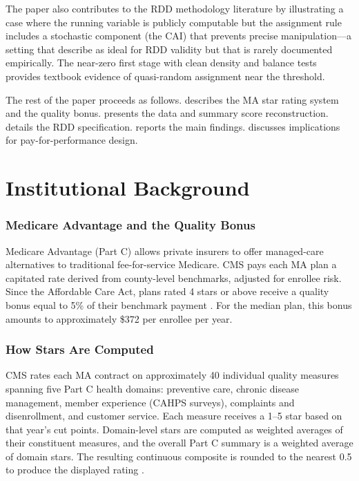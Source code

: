 \documentclass[12pt]{article}
\begin{document}
The paper also contributes to the RDD methodology literature by illustrating a case where the running variable is publicly computable but the assignment rule includes a stochastic component (the CAI) that prevents precise manipulation---a setting that \citet{lee2010} describe as ideal for RDD validity but that is rarely documented empirically. The near-zero first stage with clean density and balance tests provides textbook evidence of quasi-random assignment near the threshold.

The rest of the paper proceeds as follows.  describes the MA star rating system and the quality bonus.  presents the data and summary score reconstruction.  details the RDD specification.  reports the main findings.  discusses implications for pay-for-performance design.


\section{Institutional Background}
\label{sec:background}

\subsubsection*{Medicare Advantage and the Quality Bonus} Medicare Advantage (Part C) allows private insurers to offer managed-care alternatives to traditional fee-for-service Medicare. CMS pays each MA plan a capitated rate derived from county-level benchmarks, adjusted for enrollee risk. Since the Affordable Care Act, plans rated 4 stars or above receive a quality bonus equal to 5\% of their benchmark payment \citep{cms_advance_notice_2024}. For the median plan, this bonus amounts to approximately \$372 per enrollee per year.

\subsubsection*{How Stars Are Computed} CMS rates each MA contract on approximately 40 individual quality measures spanning five Part C health domains: preventive care, chronic disease management, member experience (CAHPS surveys), complaints and disenrollment, and customer service. Each measure receives a 1--5 star based on that year's cut points. Domain-level stars are computed as weighted averages of their constituent measures, and the overall Part C summary is a weighted average of domain stars. The resulting continuous composite is rounded to the nearest 0.5 to produce the displayed rating \citep{cms_tech_notes_2024}.
\end{document}

